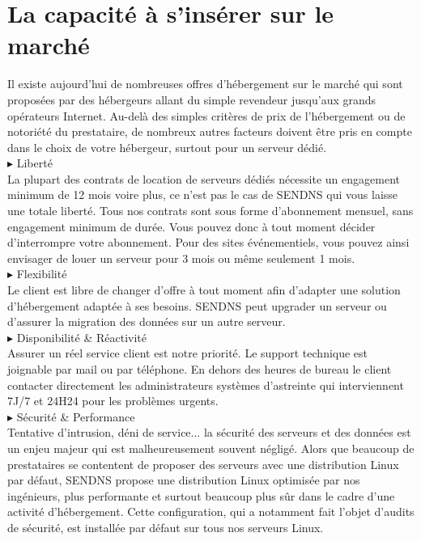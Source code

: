 \documentclass[a4paper, 12pt]{report}
\begin{document}
\section{La capacité à s’insérer sur le marché}
Il existe aujourd'hui de nombreuses offres d'hébergement sur le marché qui sont proposées par des hébergeurs allant du simple revendeur jusqu'aux grands opérateurs Internet.
Au-delà des simples critères de prix de l'hébergement ou de notoriété du prestataire, de nombreux autres facteurs doivent être pris en compte dans le choix de votre hébergeur, surtout pour un serveur dédié.
\\
\noindent $\blacktriangleright$ Liberté
\\
La plupart des contrats de location de serveurs dédiés nécessite un engagement minimum de 12 mois voire plus, ce n'est pas le cas de SENDNS qui vous laisse une totale liberté. Tous nos contrats sont sous forme d'abonnement mensuel, sans engagement minimum de durée. Vous pouvez donc à tout moment décider d'interrompre votre abonnement. Pour des sites événementiels, vous pouvez ainsi envisager de louer un serveur pour 3 mois ou même seulement 1 mois. 
\\
\noindent $\blacktriangleright$ Flexibilité
\\
Le client est libre de changer d'offre à tout moment afin d'adapter une solution d'hébergement adaptée à ses besoins. SENDNS peut upgrader un serveur ou d'assurer la migration des données sur un autre serveur.
\\
\noindent $\blacktriangleright$ Disponibilité \& Réactivité
\\
Assurer un réel service client est notre priorité. Le support technique est joignable par mail ou par téléphone. En dehors des heures de bureau le client contacter directement les administrateurs systèmes d'astreinte qui interviennent 7J/7 et 24H24 pour les problèmes urgents. 
\\
\noindent $\blacktriangleright$ Sécurité \& Performance
\\
Tentative d'intrusion, déni de service... la sécurité des serveurs et des données est un enjeu majeur qui est malheureusement souvent négligé. Alors que beaucoup de prestataires se contentent de proposer des serveurs avec une distribution Linux par défaut, SENDNS propose 
une distribution Linux optimisée par nos ingénieurs, plus performante et surtout beaucoup plus sûr dans le cadre d'une activité d'hébergement. Cette configuration, qui a notamment fait l'objet d'audits de sécurité, est installée par défaut sur tous nos serveurs Linux. 
\end{document}

